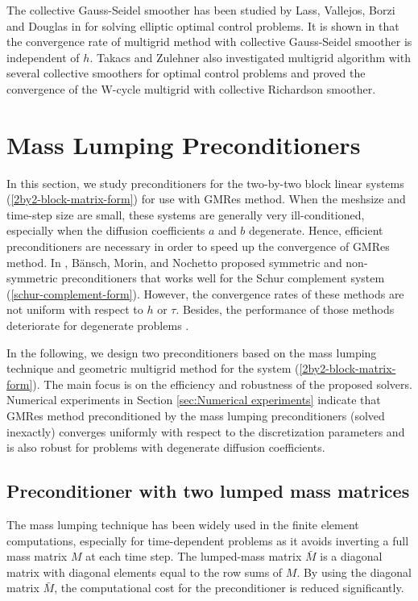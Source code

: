 \documentclass[smallcondensed]{svjour3}
\numberwithin{equation}{section} \numberwithin{table}{section}
\numberwithin{figure}{section}
\numberwithin{algorithm}{section}
\begin{document}
The collective Gauss-Seidel smoother has been studied by Lass, Vallejos, Borzi and Douglas in \cite{Lass2009} for solving elliptic optimal control problems. It is shown in \cite{Lass2009} that the convergence rate of multigrid method with collective Gauss-Seidel smoother is independent of $h$. Takacs and Zulehner \cite{Takacs2011} also investigated multigrid algorithm with several collective smoothers for optimal control problems and proved the convergence of the W-cycle multigrid with collective Richardson smoother. 

\section{Mass Lumping Preconditioners}
\label{sec:preconditioner}
In this section, we study preconditioners for the two-by-two  block linear systems (\ref{2by2-block-matrix-form}) for use with GMRes method. When the meshsize and time-step size are small, these systems are generally very ill-conditioned, especially when the diffusion coefficients $a$ and $b$ degenerate. Hence, efficient preconditioners are necessary in order to speed up the convergence of GMRes method. In \cite{bansch2011preconditioning}, B\"{a}nsch, Morin, and Nochetto proposed symmetric and non-symmetric preconditioners that works well for the Schur complement system (\ref{schur-complement-form}). However, the convergence rates of these methods are not uniform with respect to $h$ or $\tau$. Besides, the performance of those methods deteriorate for degenerate problems \cite{bansch2011preconditioning}. 

In the following, we design two preconditioners based on the mass lumping technique and geometric multigrid method for the system (\ref{2by2-block-matrix-form}). The main focus is on the efficiency and robustness of the proposed solvers. Numerical experiments in Section \ref{sec:Numerical experiments} indicate that GMRes method preconditioned by the mass lumping preconditioners (solved inexactly) converges uniformly with respect to the discretization parameters and is also robust for problems with degenerate diffusion coefficients. 

\subsection{Preconditioner with two lumped mass matrices}
\label{mass-lumping-preconditioner}
The mass lumping technique has been widely used in the finite element computations, especially for time-dependent problems as it avoids inverting a full mass matrix $M$ at each time step. The lumped-mass matrix $\bar{M}$ is a diagonal matrix with diagonal elements equal to the row sums of $M$. By using the diagonal matrix $\bar{M}$, the computational cost for the preconditioner is reduced significantly. 
\end{document}
